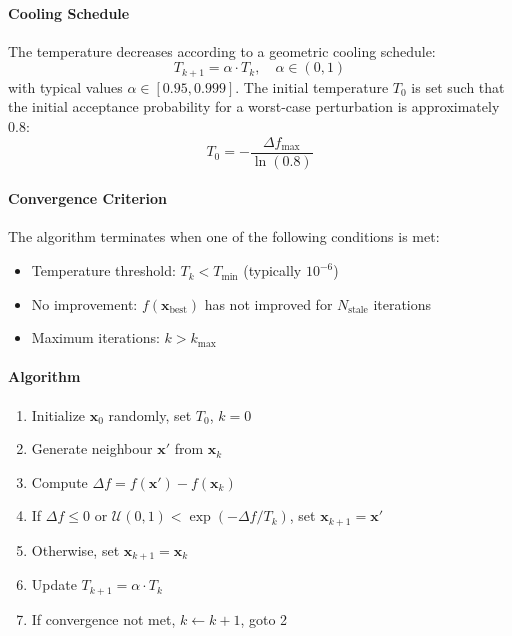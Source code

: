 \documentclass{report}
\begin{document}
\paragraph{Cooling Schedule}
The temperature decreases according to a geometric cooling schedule:
\begin{equation}
T_{k+1} = \alpha \cdot T_k, \quad \alpha \in (0, 1)
\end{equation}
with typical values $\alpha \in [0.95, 0.999]$. The initial temperature $T_0$ is set such that the initial acceptance probability for a worst-case perturbation is approximately $0.8$:
\begin{equation}
T_0 = -\frac{\Delta f_{\max}}{\ln(0.8)}
\end{equation}

\paragraph{Convergence Criterion}
The algorithm terminates when one of the following conditions is met:
\begin{itemize}
\item Temperature threshold: $T_k < T_{\min}$ (typically $10^{-6}$)
\item No improvement: $f(\mathbf{x}_{\text{best}})$ has not improved for $N_{\text{stale}}$ iterations
\item Maximum iterations: $k > k_{\max}$
\end{itemize}

\paragraph{Algorithm}
\begin{enumerate}
\item Initialize $\mathbf{x}_0$ randomly, set $T_0$, $k = 0$
\item Generate neighbour $\mathbf{x}'$ from $\mathbf{x}_k$
\item Compute $\Delta f = f(\mathbf{x}') - f(\mathbf{x}_k)$
\item If $\Delta f \leq 0$ or $\mathcal{U}(0,1) < \exp(-\Delta f / T_k)$, set $\mathbf{x}_{k+1} = \mathbf{x}'$
\item Otherwise, set $\mathbf{x}_{k+1} = \mathbf{x}_k$
\item Update $T_{k+1} = \alpha \cdot T_k$
\item If convergence not met, $k \leftarrow k+1$, goto 2
\end{enumerate}
\end{document}

